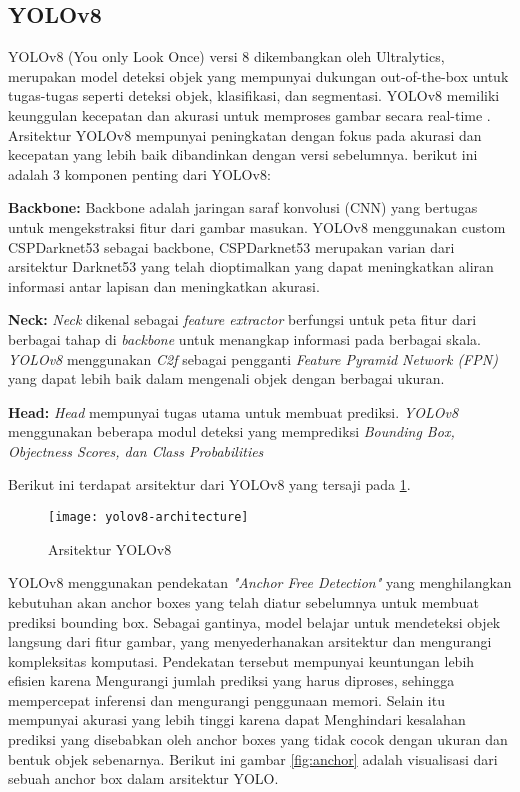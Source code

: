 \subsection{YOLOv8}
YOLOv8 (You only Look Once) versi 8 dikembangkan oleh Ultralytics, merupakan model deteksi objek yang mempunyai dukungan out-of-the-box untuk tugas-tugas seperti deteksi objek, klasifikasi, dan segmentasi. YOLOv8 memiliki keunggulan kecepatan dan akurasi untuk memproses gambar secara real-time \cite{roboflowWhatYOLOv8}. Arsitektur YOLOv8 mempunyai peningkatan dengan fokus pada akurasi dan kecepatan yang lebih baik dibandinkan dengan versi sebelumnya. berikut ini adalah 3 komponen penting dari YOLOv8:
\begin{packed_item}
	\item \textbf{Backbone:}
	Backbone adalah  jaringan saraf konvolusi (CNN) yang bertugas untuk mengekstraksi fitur dari gambar masukan. YOLOv8 menggunakan custom CSPDarknet53 sebagai backbone,  CSPDarknet53 merupakan varian dari  arsitektur Darknet53 yang telah dioptimalkan yang dapat meningkatkan aliran informasi antar lapisan dan meningkatkan akurasi.
	\item \textbf{Neck:} 
	\textit{Neck} dikenal sebagai \textit{feature extractor} berfungsi untuk peta fitur dari berbagai tahap di \textit{backbone} untuk menangkap informasi pada berbagai skala. \textit{YOLOv8} menggunakan \textit{C2f} sebagai pengganti \textit{Feature Pyramid Network (FPN)} yang dapat lebih baik dalam mengenali objek dengan berbagai ukuran.  
	\item \textbf{Head:}
	\textit{Head} mempunyai tugas utama untuk membuat prediksi. \textit{YOLOv8} menggunakan beberapa modul deteksi yang memprediksi \textit{Bounding Box, Objectness Scores, dan Class Probabilities}
\end{packed_item}	

Berikut ini terdapat  arsitektur dari YOLOv8 yang tersaji pada \cref{fig:yolov8}.
\begin{figure}[H]
	\centering
	\texttt{[image: yolov8-architecture]}
	\caption{Arsitektur YOLOv8}
	\label{fig:yolov8}
\end{figure}

YOLOv8 menggunakan pendekatan \textit{ "Anchor Free Detection"} yang menghilangkan kebutuhan akan anchor boxes yang telah diatur sebelumnya untuk membuat prediksi bounding box. Sebagai gantinya, model belajar untuk mendeteksi objek langsung dari fitur gambar, yang menyederhanakan arsitektur dan mengurangi kompleksitas komputasi. Pendekatan tersebut mempunyai keuntungan lebih efisien karena Mengurangi jumlah prediksi yang harus diproses, sehingga mempercepat inferensi dan mengurangi penggunaan memori. Selain itu mempunyai akurasi yang lebih tinggi karena dapat Menghindari kesalahan prediksi yang disebabkan oleh anchor boxes yang tidak cocok dengan ukuran dan bentuk objek sebenarnya. Berikut ini gambar \cref{fig:anchor} adalah visualisasi dari sebuah anchor box dalam arsitektur YOLO.

